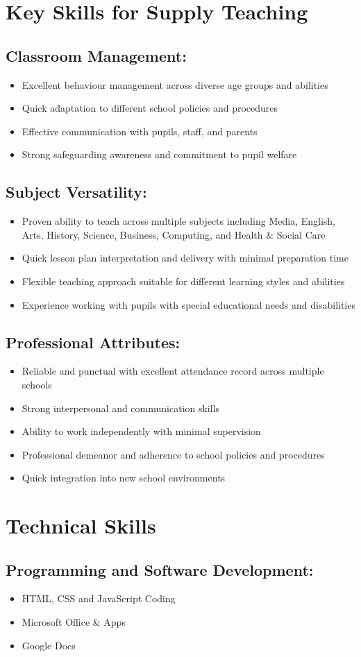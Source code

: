 \documentclass[a4paper,11pt]{article}
\newcommand{\resumeItem}[1]{
  \item\small{
    {#1 \vspace{-2pt}}
  }
}
\newcommand{\resumeItemListStart}{\begin{itemize}}
\newcommand{\resumeItemListEnd}{\end{itemize}\vspace{-5pt}}
\begin{document}
\section{Key Skills for Supply Teaching}
\subsection{Classroom Management:}
    \resumeItemListStart
        \resumeItem{Excellent behaviour management across diverse age groups and abilities}
        \resumeItem{Quick adaptation to different school policies and procedures}
        \resumeItem{Effective communication with pupils, staff, and parents}
        \resumeItem{Strong safeguarding awareness and commitment to pupil welfare}
    \resumeItemListEnd

\subsection{Subject Versatility:}
    \resumeItemListStart
        \resumeItem{Proven ability to teach across multiple subjects including Media, English, Arts, History, Science, Business, Computing, and Health \& Social Care}
        \resumeItem{Quick lesson plan interpretation and delivery with minimal preparation time}
        \resumeItem{Flexible teaching approach suitable for different learning styles and abilities}
        \resumeItem{Experience working with pupils with special educational needs and disabilities}
    \resumeItemListEnd

\subsection{Professional Attributes:}
    \resumeItemListStart
        \resumeItem{Reliable and punctual with excellent attendance record across multiple schools}
        \resumeItem{Strong interpersonal and communication skills}
        \resumeItem{Ability to work independently with minimal supervision}
        \resumeItem{Professional demeanor and adherence to school policies and procedures}
        \resumeItem{Quick integration into new school environments}
    \resumeItemListEnd

\section{Technical Skills}
\subsection{Programming and Software Development:}
    \resumeItemListStart
        \resumeItem{HTML, CSS and JavaScript Coding}
        \resumeItem{Microsoft Office \& Apps}
        \resumeItem{Google Docs}
    \resumeItemListEnd
\end{document}
